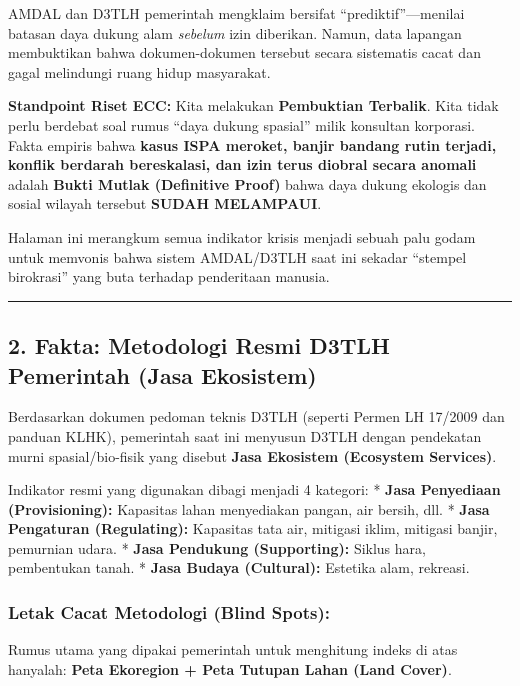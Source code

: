 \documentclass[
]{article}
\begin{document}
AMDAL dan D3TLH pemerintah mengklaim bersifat ``prediktif''---menilai
batasan daya dukung alam \emph{sebelum} izin diberikan. Namun, data
lapangan membuktikan bahwa dokumen-dokumen tersebut secara sistematis
cacat dan gagal melindungi ruang hidup masyarakat.

\textbf{Standpoint Riset ECC:} Kita melakukan \textbf{Pembuktian
Terbalik}. Kita tidak perlu berdebat soal rumus ``daya dukung spasial''
milik konsultan korporasi. Fakta empiris bahwa \textbf{kasus ISPA
meroket, banjir bandang rutin terjadi, konflik berdarah bereskalasi, dan
izin terus diobral secara anomali} adalah \textbf{Bukti Mutlak
(Definitive Proof)} bahwa daya dukung ekologis dan sosial wilayah
tersebut \textbf{SUDAH MELAMPAUI}.

Halaman ini merangkum semua indikator krisis menjadi sebuah palu godam
untuk memvonis bahwa sistem AMDAL/D3TLH saat ini sekadar ``stempel
birokrasi'' yang buta terhadap penderitaan manusia.

\begin{center}\rule{0.5\linewidth}{0.5pt}\end{center}

\subsection{2. Fakta: Metodologi Resmi D3TLH Pemerintah (Jasa
Ekosistem)}\label{fakta-metodologi-resmi-d3tlh-pemerintah-jasa-ekosistem}

Berdasarkan dokumen pedoman teknis D3TLH (seperti Permen LH 17/2009 dan
panduan KLHK), pemerintah saat ini menyusun D3TLH dengan pendekatan
murni spasial/bio-fisik yang disebut \textbf{Jasa Ekosistem (Ecosystem
Services)}.

Indikator resmi yang digunakan dibagi menjadi 4 kategori: * \textbf{Jasa
Penyediaan (Provisioning):} Kapasitas lahan menyediakan pangan, air
bersih, dll. * \textbf{Jasa Pengaturan (Regulating):} Kapasitas tata
air, mitigasi iklim, mitigasi banjir, pemurnian udara. * \textbf{Jasa
Pendukung (Supporting):} Siklus hara, pembentukan tanah. * \textbf{Jasa
Budaya (Cultural):} Estetika alam, rekreasi.

\subsubsection{Letak Cacat Metodologi (Blind
Spots):}\label{letak-cacat-metodologi-blind-spots}

Rumus utama yang dipakai pemerintah untuk menghitung indeks di atas
hanyalah: \textbf{Peta Ekoregion + Peta Tutupan Lahan (Land Cover)}.
\end{document}
